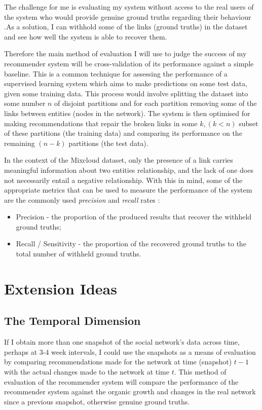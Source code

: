 The challenge for me is evaluating my system without access to the real users of the system who would provide genuine ground truths regarding their behaviour \cite{eval_cfsys}.As a solution, I can withhold some of the links (ground truths) in the dataset and see how well the system is able to recover them.

Therefore the main method of evaluation I will use to judge the success of my recommender system will be cross-validation of its performance against a simple baseline. This is a common technique for assessing the performance of a supervised learning system which aims to make predictions on some test data, given some training data. This process would involve splitting the dataset into some number $n$ of disjoint partitions and for each partition removing some of the links between entities (nodes in the network). The system is then optimised for making recommendations that repair the broken links in some $k, (k < n)$ subset of these partitions (the training data) and comparing its performance on the remaining $(n-k)$ partitions (the test data). 

In the context of the Mixcloud dataset, only the presence of a link carries meaningful information about two entities relationship, and the lack of one does not necessarily entail a negative relationship. With this in mind, some of the appropriate metrics that can be used to measure the performance of the system are the commonly used \emph{precision} and \emph{recall} rates \cite{eval_measures}:
\begin{itemize}
 \item Precision - the proportion of the produced results that recover the withheld ground truths;
 \item Recall / Sensitivity - the proportion of the recovered ground truths to the total number of withheld ground truths.
\end{itemize}

\section{Extension Ideas}

\subsection*{The Temporal Dimension}
If I obtain more than one snapshot of the social network's data across time, perhaps at 3-4 week intervals, I could use the snapshots as a means of evaluation by comparing recommendations made for the network at time (snapshot) $t-1$ with the actual changes made to the network at time $t$. This method of evaluation of the recommender system will compare the performance of the recommender system against the organic growth and changes in the real network since a previous snapshot, otherwise genuine ground truths.


